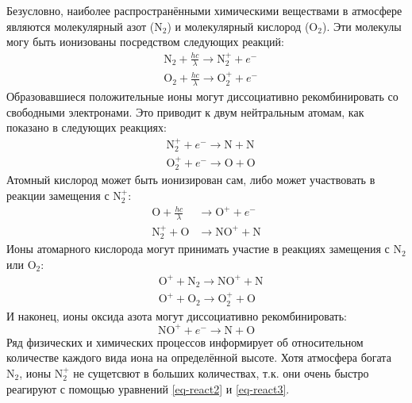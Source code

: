 Безусловно, наиболее распространёнными химическими веществами в атмосфере являются молекулярный азот ($\text{N}_2$) и молекулярный кислород ($\text{O}_2$).
Эти молекулы могу быть ионизованы посредством следующих реакций: 
\begin{equation}
\label{eq-react1}
\begin{aligned}
&\text{N}_2+\frac{hc}{\lambda}\rightarrow\text{N}_2^{+}+e^{-} \\
&\text{O}_2+\frac{hc}{\lambda}\rightarrow\text{O}_2^{+}+e^{-}     
\end{aligned}
\end{equation}
Образовавшиеся положительные ионы могут диссоциативно рекомбинировать со свободными электронами.
Это приводит к двум нейтральным атомам, как показано в следующих реакциях:
\begin{equation}
\label{eq-react2}
\begin{aligned}
&\text{N}_2^{+}+e^{-}\rightarrow\text{N}+\text{N} \\
&\text{O}_2^{+}+e^{-}\rightarrow\text{O}+\text{O} 
\end{aligned}
\end{equation}
Атомный кислород может быть ионизирован сам, либо может участвовать в реакции замещения с $\text{N}_2^{+}$: 
\begin{equation}
\begin{aligned}
\label{eq-react3}
\text{O}+\frac{hc}{\lambda}&\rightarrow\text{O}^{+}+e^{-} \\
\text{N}_2^{+}+\text{O}&\rightarrow\text{NO}^{+}+\text{N}  
\end{aligned}
\end{equation}
Ионы атомарного кислорода могут принимать участие в реакциях замещения с $\text{N}_2$ или $\text{O}_2$:
\begin{equation}
\label{eq-react4}
\begin{aligned}
&\text{O}^{+}+\text{N}_2\rightarrow\text{NO}^{+}+\text{N} \\
&\text{O}^{+}+\text{O}_2\rightarrow\text{O}_2^{+}+\text{O} 
\end{aligned}
\end{equation}
И наконец, ионы оксида азота могут диссоциативно рекомбинировать:
\begin{equation}
\label{eq-react5}
\text{NO}^{+}+e^{-}\rightarrow\text{N}+\text{O}
\end{equation}
Ряд физических и химических процессов информирует об относительном количестве каждого вида иона на определённой высоте.
Хотя атмосфера богата $\text{N}_2$, ионы $\text{N}_2^{+}$ не сущетсвют в больших количествах, т.к. они очень быстро реагируют с помощью уравнений \eqref{eq-react2} и \eqref{eq-react3}. 
